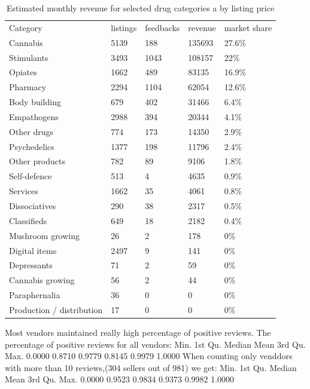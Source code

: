 \documentclass[
  digital, %
  table,   %
  lof,     %
  lot,     %
  oneside
]{fithesis3}
\begin{document}
\begin{table}
    \caption{Estimated monthly revenue for selected drug categories a by listing price}
    \label{categories}
    \begin{tabular}{|l|l|l|l|l|}
Category & listings & feedbacks & revenue & market share \\
Cannabis & 5139 & 188 & 135693 & 27.6\% \\
Stimulants & 3493 & 1043 & 108157 & 22\% \\
Opiates & 1662 & 489 & 83135 & 16.9\% \\
Pharmacy & 2294 & 1104 & 62054 & 12.6\% \\
Body building & 679 & 402 & 31466 & 6.4\% \\
Empathogens & 2988 & 394 & 20344 & 4.1\% \\
Other drugs &  774 & 173 & 14350 & 2.9\% \\
Psychedelics & 1377 & 198 & 11796 & 2.4\% \\
Other products &  782 & 89 & 9106 & 1.8\% \\
Self-defence &  513 & 4 & 4635 & 0.9\% \\
Services & 1662 & 35 & 4061 & 0.8\% \\
Dissociatives &  290 & 38 & 2317 & 0.5\% \\
Classifieds &  649 & 18 & 2182 & 0.4\% \\
Mushroom growing &   26 & 2 & 178 & 0\% \\
Digital items & 2497 & 9 & 141 & 0\% \\
Depressants &   71 & 2 & 59 & 0\% \\
Cannabis growing &  56 & 2 & 44 & 0\% \\
Paraphernalia  &  36 & 0 & 0 & 0\% \\
Production / distribution &   17 & 0 & 0 & 0\% 
    \end{tabular}
\end{table}



Most vendors maintained really high percentage of positive reviews.
The percentage of positive reviews for all vendors:
   Min. 1st Qu.  Median    Mean 3rd Qu.    Max. 
 0.0000  0.8710  0.9779  0.8145  0.9979  1.0000 
 When counting only venddors with more than 10 reviews,(304 sellers out of 981) we get:
   Min. 1st Qu.  Median    Mean 3rd Qu.    Max. 
 0.0000  0.9523  0.9834  0.9373  0.9982  1.0000
 
\end{document}
